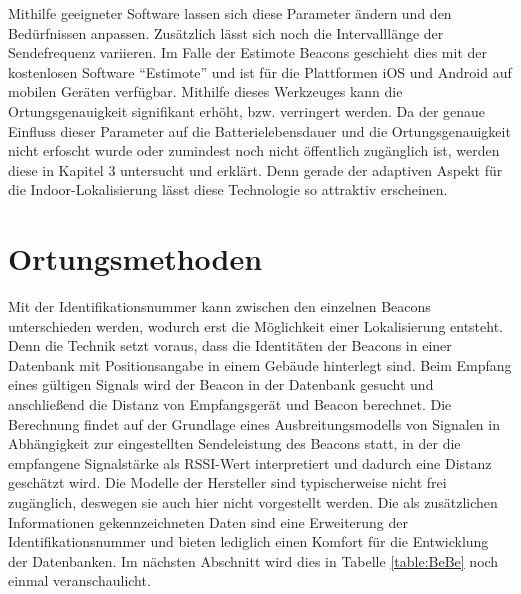 Mithilfe geeigneter Software lassen sich diese Parameter ändern und den Bedürfnissen anpassen. Zusätzlich lässt sich noch die Intervalllänge der Sendefrequenz variieren. Im Falle der Estimote Beacons geschieht dies mit der kostenlosen Software "`Estimote"' und ist für die Plattformen iOS und Android auf mobilen Geräten verfügbar. Mithilfe dieses Werkzeuges kann die Ortungsgenauigkeit signifikant erhöht, bzw. verringert werden. Da der genaue Einfluss dieser Parameter auf die Batterielebensdauer und die Ortungsgenauigkeit nicht erfoscht wurde oder zumindest noch nicht öffentlich zugänglich ist, werden diese in Kapitel 3 untersucht und erklärt. Denn gerade der adaptiven Aspekt für die Indoor-Lokalisierung lässt diese Technologie so attraktiv erscheinen.

\section{Ortungsmethoden}
Mit der Identifikationsnummer kann zwischen den einzelnen Beacons unterschieden werden, wodurch erst die Möglichkeit einer Lokalisierung entsteht. Denn die Technik setzt voraus, dass die Identitäten der Beacons in einer Datenbank mit Positionsangabe in einem Gebäude hinterlegt sind. Beim Empfang eines gültigen Signals wird der Beacon in der Datenbank gesucht und anschließend die Distanz von Empfangsgerät und Beacon berechnet. Die Berechnung findet auf der Grundlage eines Ausbreitungsmodells von Signalen in Abhängigkeit zur eingestellten Sendeleistung des Beacons statt, in der die empfangene Signalstärke als RSSI-Wert interpretiert  und dadurch eine Distanz geschätzt wird. Die Modelle der Hersteller sind typischerweise nicht frei zugänglich, deswegen sie auch hier nicht vorgestellt werden. Die als zusätzlichen Informationen gekennzeichneten Daten sind eine Erweiterung der Identifikationsnummer und bieten lediglich einen Komfort für die Entwicklung der Datenbanken. Im nächsten Abschnitt wird dies in Tabelle \ref{table:BeBe} noch einmal veranschaulicht.\\

